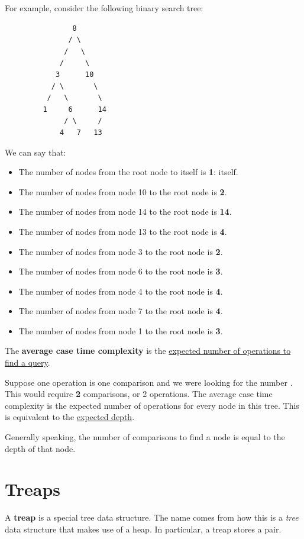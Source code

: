 \documentclass[letterpaper]{article}
\begin{document}
For example, consider the following binary search tree: 
\begin{verbatim}
                8 
               / \ 
              /   \ 
             /     \ 
            3      10
           / \       \ 
          /   \       \ 
         1     6      14
              / \     /
             4   7   13
\end{verbatim}
We can say that: 
\begin{itemize}
    \item The number of nodes from the root node to itself is \textbf{1}: itself. 
    \item The number of nodes from node 10 to the root node is \textbf{2}. 
    \item The number of nodes from node 14 to the root node is \textbf{14}.
    \item The number of nodes from node 13 to the root node is \textbf{4}. 
    \item The number of nodes from node 3 to the root node is \textbf{2}.
    \item The number of nodes from node 6 to the root node is \textbf{3}. 
    \item The number of nodes from node 4 to the root node is \textbf{4}. 
    \item The number of nodes from node 7 to the root node is \textbf{4}. 
    \item The number of nodes from node 1 to the root node is \textbf{3}. 
\end{itemize}
The \textbf{average case time complexity} is the \underline{expected number of operations to find a query}. 

\bigskip 

Suppose one operation is one comparison and we were looking for the number . This would require \textbf{2} comparisons, or 2 operations. The average case time complexity is the expected number of operations for every node in this tree. This is equivalent to the \underline{expected depth}. 

\bigskip 

Generally speaking, the number of comparisons to find a node is equal to the depth of that node. 


\newpage 
\section{Treaps}
A \textbf{treap} is a special tree data structure. The name comes from how this is a \emph{tree} data structure that makes use of a heap. In particular, a treap stores a  pair. 
\end{document}
